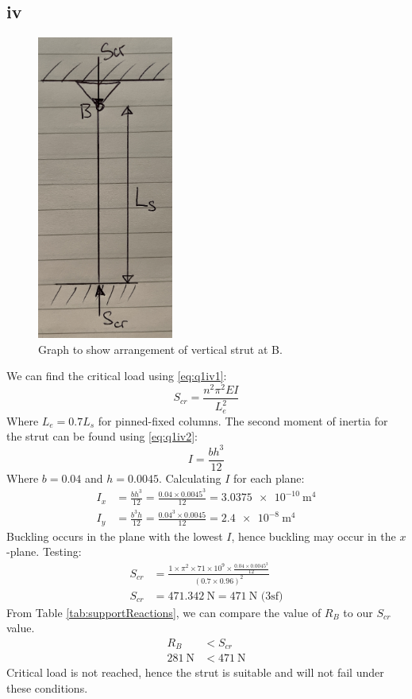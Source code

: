 \documentclass[11pt]{article}
\numberwithin{equation}{section}
\begin{document}
\subsection{iv}
\begin{figure}[H]
    \centering
    \includegraphics[height = 10cm]{./img/q1iv1.jpg}
    \caption{Graph to show arrangement of vertical strut at B.}
    \label{fig:q1iv}
\end{figure}
We can find the critical load using \ref{eq:q1iv1}:
\begin{equation}
    S_{cr} = \frac{n^2 \pi^2 EI}{L_e^2} \label{eq:q1iv1}
\end{equation}
Where $L_e = 0.7L_s$ for pinned-fixed columns. The second moment of inertia for the strut can be found using \ref{eq:q1iv2}:
\begin{equation}
    I = \frac{bh^3}{12} \label{eq:q1iv2}
\end{equation}
Where $b = 0.04$ and $h = 0.0045$. Calculating $I$ for each plane:
\begin{align}
    I_x &= \frac{bh^3}{12} = \frac{0.04\times 0.0045^3}{12} = \SI{3.0375e-10}{\meter\tothe{4}}\\
    I_y &= \frac{b^3h}{12} = \frac{0.04^3\times 0.0045}{12} = \SI{2.4e-8}{\meter\tothe{4}}
\end{align}
Buckling occurs in the plane with the lowest $I$, hence buckling may occur in the $x$-plane. Testing:
\begin{align}
    S_{cr} &= \frac{1\times \pi^2 \times 71\times 10^{9}\times \frac{0.04\times 0.0045^3}{12}}{(0.7\times0.96)^2}\\
    S_{cr} &= \SI{471.342}{\newton} = \SI{471}{\newton} \textrm{ (3sf)}
\end{align}
From Table \ref{tab:supportReactions}, we can compare the value of $R_B$ to our $S_{cr}$ value.
\begin{align}
    R_B &< S_{cr}\\
    \SI{281}{\newton} &< \SI{471}{\newton}
\end{align}
Critical load is not reached, hence the strut is suitable and will not fail under these conditions. 
\end{document}
